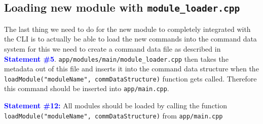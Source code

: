 \documentclass{article}
\newcommand{\statement}[1]{\par\medskip
  \textcolor{blue}{\textbf{#1:}}\space
}
\begin{document}
\subsection{Loading new module with \texttt{module\_loader.cpp}}\label{modload}
The last thing we need to do for the new module to completely integrated with 
the CLI is to actually be able to load the new commands into the command data 
system for this we need to create a command data file as described in 
\textcolor{blue}{\textbf{Statement \#5}}. 
\texttt{app/modules/main/module\_loader.cpp} then takes the metadata out of 
this file and inserts it into the command data structure when the 
\texttt{loadModule("moduleName", commDataStructure)} function gets called. 
Therefore this command should be inserted into \texttt{app/main.cpp}.

\statement{Statement \#12} All modules should be loaded by calling the 
function \texttt{loadModule("moduleName", commDataStructure)} from 
\texttt{app/main.cpp}
\end{document}
